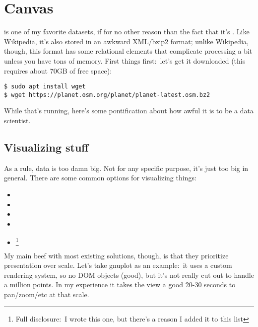 \section{Canvas}
 is one of my favorite datasets, if for
no other reason than the fact that it's
. Like
Wikipedia, it's also stored in an awkward XML/bzip2 format; unlike Wikipedia,
though, this format has some relational elements that complicate processing a
bit unless you have tons of memory. First things first:~let's get it downloaded
(this requires about 70GB of free space):

\begin{verbatim}
$ sudo apt install wget
$ wget https://planet.osm.org/planet/planet-latest.osm.bz2 \end{verbatim}

While that's running, here's some pontification about how awful it is to be a
data scientist.

\subsection{Visualizing stuff}
As a rule, data is too damn big. Not for any specific purpose, it's just too big
in general. There are some common options for visualizing things:

\begin{itemize}
  \item {}
  \item {}
  \item {}
  \item {}
  \item {}\footnote{Full disclosure:~I wrote this one, but there's a reason I added it to this list}
\end{itemize}

My main beef with most existing solutions, though, is that they prioritize
presentation over scale. Let's take gnuplot as an example:~it uses a custom
rendering system, so no DOM objects (good), but it's not really cut out to
handle a million points. In my experience it takes the view a good 20-30 seconds
to pan/zoom/etc at that scale.

